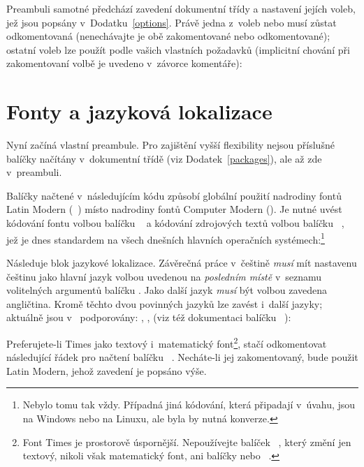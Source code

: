 Preambuli samotné předchází zavedení dokumentní třídy  a
nastavení jejích voleb, jež jsou popsány v~Dodatku~\ref{options}. Právě jedna
z~voleb  nebo  musí zůstat odkomentovaná (nenechávajte
je obě zakomentované nebo odkomentované); ostatní voleb lze použít podle
vašich vlastních požadavků (implicitní chování při zakomentovaní volbě je
uvedeno v~závorce komentáře):


\section{Fonty a jazyková lokalizace}\label{fontslang}%

Nyní začíná vlastní preambule. Pro zajištění vyšší flexibility nejsou
příslušné balíčky načítány v~dokumentní třídě (viz Dodatek~\ref{packages}),
ale až zde v~preambuli.

Balíčky načtené v~následujícím kódu způsobí globální použití nadrodiny fontů
Latin Modern (~\cite{Jac:LIVE:CTAN:lm}) místo nadrodiny fontů Computer
Modern (). Je nutné uvést kódování fontu volbou  balíčku
~\cite{LtX:LIVE:CTAN:fontenc} a kódování zdrojových textů volbou
 balíčku ~\cite{LtX:LIVE:CTAN:inputenc}, jež je dnes
standardem na všech dnešních hlavních operačních systémech:\footnote{Nebylo
  tomu tak vždy. Případná jiná kódování, která připadají v~úvahu, jsou
   na Windows nebo  na Linuxu, ale byla by nutná
  konverze.}


Následuje blok jazykové lokalizace. Závěrečná práce v~češtině \emph{musí} mít
nastavenu češtinu jako hlavní jazyk volbou  uvedenou na
\emph{posledním místě} v~seznamu volitelných argumentů balíčku
. Jako další jazyk \emph{musí} být volbou  zavedena
angličtina. Kromě těchto dvou povinných jazyků lze zavést i~další jazyky;
aktuálně jsou v~\pkg{\ipotname} podporovány: , ,
 (viz též dokumentaci balíčku
~\cite{Bra:LIVE:CTAN:Babel}):


Preferujete-li Times jako textový i~matematický font\footnote{Font Times je
  prostorově úspornější. Nepoužívejte balíček
  ~\cite{Rah:LIVE:CTAN:times}, který změní jen textový, nikoli však
  matematický font, ani balíčky  nebo
  ~\cite{Vie:LIVE:CTAN:mathptmx,%
    Har:LIVE:CTAN:psnfss}.}, stačí odkomentovat následující řádek pro načtení
balíčku ~\cite{Ryu:LIVE:CTAN:txfonts}. Necháte-li jej
zakomentovaný, bude použit Latin Modern, jehož zavedení je popsáno výše.


